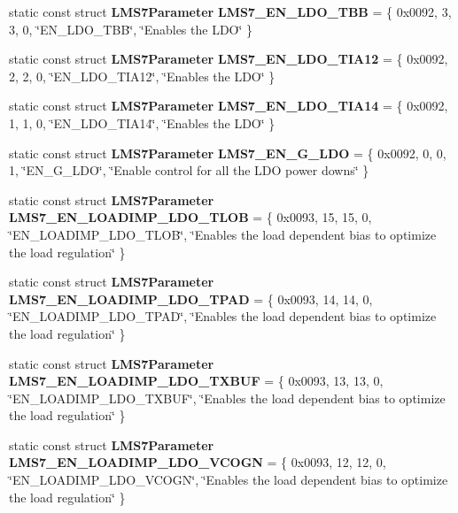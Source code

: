 \begin{DoxyCompactItemize}
static const struct {\bf L\+M\+S7\+Parameter} {\bf L\+M\+S7\+\_\+\+E\+N\+\_\+\+L\+D\+O\+\_\+\+T\+BB} = \{ 0x0092, 3, 3, 0, \char`\"{}\+E\+N\+\_\+\+L\+D\+O\+\_\+\+T\+B\+B\char`\"{}, \char`\"{}\+Enables the L\+D\+O\char`\"{} \}
\item 
static const struct {\bf L\+M\+S7\+Parameter} {\bf L\+M\+S7\+\_\+\+E\+N\+\_\+\+L\+D\+O\+\_\+\+T\+I\+A12} = \{ 0x0092, 2, 2, 0, \char`\"{}\+E\+N\+\_\+\+L\+D\+O\+\_\+\+T\+I\+A12\char`\"{}, \char`\"{}\+Enables the L\+D\+O\char`\"{} \}
\item 
static const struct {\bf L\+M\+S7\+Parameter} {\bf L\+M\+S7\+\_\+\+E\+N\+\_\+\+L\+D\+O\+\_\+\+T\+I\+A14} = \{ 0x0092, 1, 1, 0, \char`\"{}\+E\+N\+\_\+\+L\+D\+O\+\_\+\+T\+I\+A14\char`\"{}, \char`\"{}\+Enables the L\+D\+O\char`\"{} \}
\item 
static const struct {\bf L\+M\+S7\+Parameter} {\bf L\+M\+S7\+\_\+\+E\+N\+\_\+\+G\+\_\+\+L\+DO} = \{ 0x0092, 0, 0, 1, \char`\"{}\+E\+N\+\_\+\+G\+\_\+\+L\+D\+O\char`\"{}, \char`\"{}\+Enable control for all the L\+D\+O power downs\char`\"{} \}
\item 
static const struct {\bf L\+M\+S7\+Parameter} {\bf L\+M\+S7\+\_\+\+E\+N\+\_\+\+L\+O\+A\+D\+I\+M\+P\+\_\+\+L\+D\+O\+\_\+\+T\+L\+OB} = \{ 0x0093, 15, 15, 0, \char`\"{}\+E\+N\+\_\+\+L\+O\+A\+D\+I\+M\+P\+\_\+\+L\+D\+O\+\_\+\+T\+L\+O\+B\char`\"{}, \char`\"{}\+Enables the load dependent bias to optimize the load regulation\char`\"{} \}
\item 
static const struct {\bf L\+M\+S7\+Parameter} {\bf L\+M\+S7\+\_\+\+E\+N\+\_\+\+L\+O\+A\+D\+I\+M\+P\+\_\+\+L\+D\+O\+\_\+\+T\+P\+AD} = \{ 0x0093, 14, 14, 0, \char`\"{}\+E\+N\+\_\+\+L\+O\+A\+D\+I\+M\+P\+\_\+\+L\+D\+O\+\_\+\+T\+P\+A\+D\char`\"{}, \char`\"{}\+Enables the load dependent bias to optimize the load regulation\char`\"{} \}
\item 
static const struct {\bf L\+M\+S7\+Parameter} {\bf L\+M\+S7\+\_\+\+E\+N\+\_\+\+L\+O\+A\+D\+I\+M\+P\+\_\+\+L\+D\+O\+\_\+\+T\+X\+B\+UF} = \{ 0x0093, 13, 13, 0, \char`\"{}\+E\+N\+\_\+\+L\+O\+A\+D\+I\+M\+P\+\_\+\+L\+D\+O\+\_\+\+T\+X\+B\+U\+F\char`\"{}, \char`\"{}\+Enables the load dependent bias to optimize the load regulation\char`\"{} \}
\item 
static const struct {\bf L\+M\+S7\+Parameter} {\bf L\+M\+S7\+\_\+\+E\+N\+\_\+\+L\+O\+A\+D\+I\+M\+P\+\_\+\+L\+D\+O\+\_\+\+V\+C\+O\+GN} = \{ 0x0093, 12, 12, 0, \char`\"{}\+E\+N\+\_\+\+L\+O\+A\+D\+I\+M\+P\+\_\+\+L\+D\+O\+\_\+\+V\+C\+O\+G\+N\char`\"{}, \char`\"{}\+Enables the load dependent bias to optimize the load regulation\char`\"{} \}

\end{DoxyCompactItemize}

